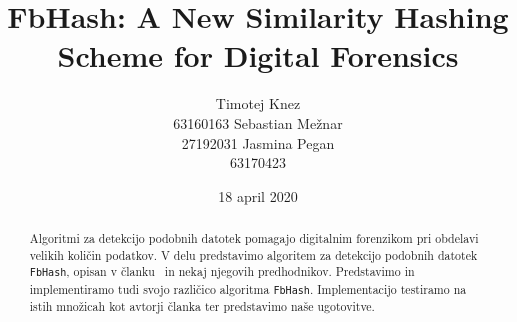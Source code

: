 \documentclass{acm_proc_article-sp}
\begin{document}
\title{FbHash: A New Similarity Hashing Scheme for Digital Forensics}

\author{
\alignauthor
Timotej Knez \\
63160163%
\alignauthor
Sebastian Mežnar\\
27192031 %
\alignauthor 
Jasmina Pegan \\
63170423%
}

\date{18 april 2020}

\maketitle
\begin{abstract}
Algoritmi za detekcijo podobnih datotek pomagajo digitalnim forenzikom pri obdelavi velikih količin podatkov. V delu predstavimo algoritem za detekcijo podobnih datotek \texttt{FbHash}, opisan v članku~\cite{fbhash} in nekaj njegovih predhodnikov. Predstavimo in implementiramo tudi svojo različico algoritma \texttt{FbHash}. Implementacijo testiramo na istih množicah kot avtorji članka ter predstavimo naše ugotovitve.
\end{abstract}
\end{document}
